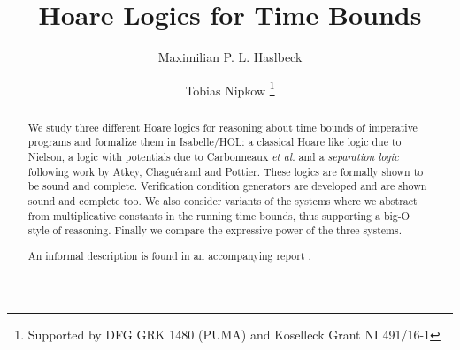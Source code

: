 \documentclass[11pt,a4paper]{article}
\begin{document}
\title{Hoare Logics for Time Bounds} 
\author{Maximilian P. L. Haslbeck\and Tobias Nipkow%
\thanks{Supported by DFG GRK 1480 (PUMA) and Koselleck Grant NI 491/16-1}
}
\maketitle

\begin{abstract}
 We study three different Hoare logics for reasoning about time bounds of
  imperative programs and formalize them in Isabelle/HOL: a classical Hoare
  like logic due to Nielson, a logic with potentials due to Carbonneaux \emph{et
    al.} and a \emph{separation logic} following work by Atkey, Chagu\'erand
  and Pottier.  These logics are formally shown to be sound and complete.
  Verification condition generators are developed and are shown sound and
  complete too.  We also consider variants of the systems where we abstract
  from multiplicative constants in the running time bounds, thus supporting a
  big-O style of reasoning.  Finally we compare the expressive power of the
  three systems.   

An informal description is found in an accompanying report \cite{HaslbeckN-TACAS18}. 
\end{abstract}

\setcounter{tocdepth}{2}
\tableofcontents
\newpage





\end{document}
